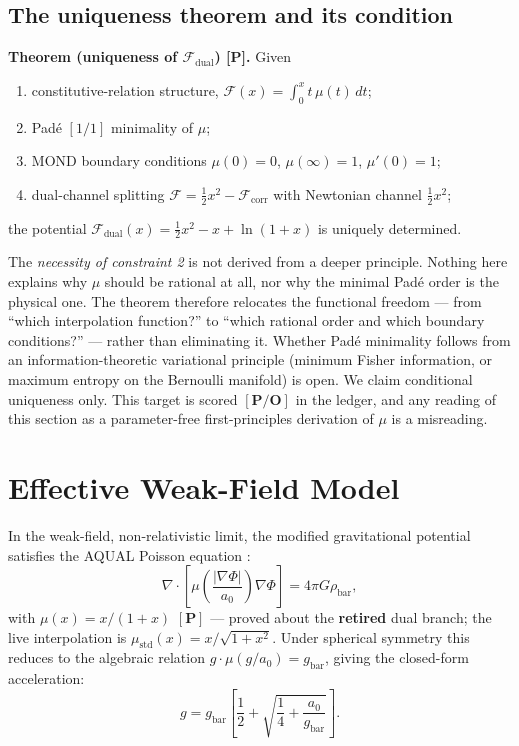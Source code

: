 \documentclass[aps,prd,preprint,superscriptaddress,nofootinbib,amsmath,amssymb,floatfix]{revtex4-2}
\makeatletter
\DeclareRobustCommand{\_}{%
    \ifmmode\nfss@text{\textunderscore}\else\textunderscore\penalty\z@\fi}%
\makeatother
\begin{document}
\subsection{The uniqueness theorem and its condition}

\textbf{Theorem (uniqueness of $\mathcal{F}_{\text{dual}}$) [P].} Given
\begin{enumerate}
    \item constitutive-relation structure, $\mathcal{F}(x) = \int_0^x t\,\mu(t)\,dt$;
    \item Pad\'e $[1/1]$ minimality of $\mu$;
    \item MOND boundary conditions $\mu(0)=0$, $\mu(\infty)=1$, $\mu'(0)=1$;
    \item dual-channel splitting $\mathcal{F} = \tfrac{1}{2}x^2 - \mathcal{F}_{\text{corr}}$ with Newtonian channel $\tfrac{1}{2}x^2$;
\end{enumerate}
the potential $\mathcal{F}_{\text{dual}}(x) = \tfrac{1}{2}x^2 - x + \ln(1+x)$ is uniquely determined.

\begin{tcolorbox}[colback=boxbg,colframe=primary,title=\textbf{What this theorem does not claim $\mathbf{[O]}$}]
The \emph{necessity of constraint 2} is not derived from a deeper principle. Nothing here explains why $\mu$ should be rational at all, nor why the minimal Pad\'e order is the physical one. The theorem therefore relocates the functional freedom --- from ``which interpolation function?'' to ``which rational order and which boundary conditions?'' --- rather than eliminating it. Whether Pad\'e minimality follows from an information-theoretic variational principle (minimum Fisher information, or maximum entropy on the Bernoulli manifold) is open. We claim conditional uniqueness only. This target is scored $\mathbf{[P/O]}$ in the ledger, and any reading of this section as a parameter-free first-principles derivation of $\mu$ is a misreading.
\end{tcolorbox}

\section{Effective Weak-Field Model}
\label{sec:model}

In the weak-field, non-relativistic limit, the modified gravitational potential satisfies the AQUAL Poisson equation \cite{Bekenstein1984}:
\begin{equation}
\label{eq:aqual_field}
\nabla \cdot \left[ \mu\!\left(\frac{|\nabla\Phi|}{a_0}\right) \nabla\Phi \right] = 4\pi G \rho_{\text{bar}},
\end{equation}
with $\mu(x) = x/(1+x)$ $\mathbf{[P]}$ — proved about the \textbf{retired} dual branch; the live interpolation is $\mu_{\text{std}}(x)=x/\sqrt{1+x^2}$. Under spherical symmetry this reduces to the algebraic relation $g \cdot \mu(g/a_0) = g_{\text{bar}}$, giving the closed-form acceleration:
\begin{equation}
\label{eq:g_predict}
g = g_{\text{bar}} \left[ \frac{1}{2} + \sqrt{\frac{1}{4} + \frac{a_0}{g_{\text{bar}}}} \right].
\end{equation}
\end{document}
